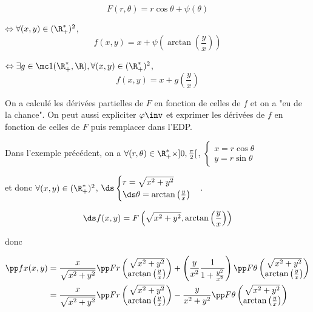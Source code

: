 \begin{exemple}
    $$F(r, \theta) = r \cos \theta + \psi(\theta)$$

    $\Leftrightarrow \forall (x, y) \in (\R^*_+)^2$,
    $$f(x, y) = x + \psi \left( \arctan \left( \frac y x \right) \right)$$

    $\Leftrightarrow \exists g \in \mc 1 (\R_+^*, \R), \forall (x, y) \in (\R^*_+)^2$,
    $$f(x, y) = x + g \left( \frac y x \right)$$
\end{exemple}

\begin{remarque}
    On a calculé les dérivées partielles de $F$ en fonction de celles de $f$ et on a 
    "eu de la chance". On peut aussi expliciter $\varphi\inv $ et exprimer les dérivées de $f$ 
    en fonction de celles de $F$ puis remplacer dans l'EDP. 
\end{remarque}

Dans l'exemple précédent, on a $\forall (r, \theta) \in \R_+^* \times ]0, \frac \pi 2 [$, 
$\begin{cases}
    x = r \cos \theta \\
    y = r \sin \theta
\end{cases}$ 

et donc $\forall (x, y) \in (\R_+^*)^2$, 
$\ds \begin{cases}
    r = \sqrt{x^2 + y^2} \\
    \ds \theta = \arctan \left( \frac y x \right)
\end{cases}$.

$$\ds f(x, y) = F\left(\sqrt{x^2 + y^2}, \arctan \left( \frac y x \right)\right)$$

donc 

\begin{align}
        \pp f x (x, y) & = \frac x {\sqrt{x^2 + y^2}} \pp F r \begin{pmatrix}
        \sqrt{x^2 + y^2} \\
        \arctan \left( \frac y x \right)
    \end{pmatrix} + \left( \frac y {x^2} \frac 1 {1 + \frac{y^2}{x^2}} \right) \pp F \theta \begin{pmatrix}
        \sqrt{x^2 + y^2} \\
        \arctan \left( \frac y x \right)
    \end{pmatrix} \\
    & = \frac x {\sqrt{x^2 + y^2}} \pp F r \begin{pmatrix}
        \sqrt{x^2 + y^2} \\
        \arctan \left( \frac y x \right)
    \end{pmatrix} - \frac y {x^2 + y^2} \pp F \theta \begin{pmatrix}
        \sqrt{x^2 + y^2} \\
        \arctan \left( \frac y x \right)
    \end{pmatrix}
\end{align}

